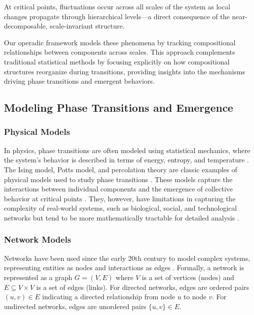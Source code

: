 At critical points, fluctuations occur across all scales of the system as local changes propagate through hierarchical levels—a direct consequence of the near-decomposable, scale-invariant structure.

Our operadic framework models these phenomena by tracking compositional relationships between components across scales. This approach complements traditional statistical methods \citep{stanley1999scaling, goldenfeld1992lectures} by focusing explicitly on how compositional structures reorganize during transitions, providing insights into the mechanisms driving phase transitions and emergent behaviors.

\subsection{Modeling Phase Transitions and Emergence}

\subsubsection{Physical Models}

In physics, phase transitions are often modeled using statistical mechanics, where the system's behavior is described in terms of energy, entropy, and temperature \citep{stanley1971phase, kadanoff2000statistical}. The Ising model, Potts model, and percolation theory are classic examples of physical models used to study phase transitions \citep{onsager1944crystal, stauffer2018introduction}. These models capture the interactions between individual components and the emergence of collective behavior at critical points \citep{binney1992theory}. They, however, have limitations in capturing the complexity of real-world systems, such as biological, social, and technological networks but tend to be more mathematically tractable for detailed analysis \citep{newman2011structure}.

\subsubsection{Network Models}

Networks have been used since the early 20th century to model complex systems, representing entities as nodes and interactions as edges \citep{watts1998collective, barabasi1999emergence}. Formally, a network is represented as a graph $G = (V, E)$ where $V$ is a set of vertices (nodes) and $E \subseteq V \times V$ is a set of edges (links). For directed networks, edges are ordered pairs $(u, v) \in E$ indicating a directed relationship from node $u$ to node $v$. For undirected networks, edges are unordered pairs $\{u, v\} \in E$.

